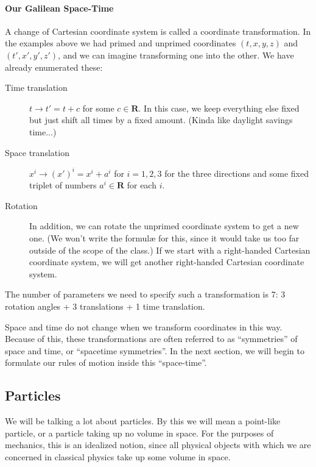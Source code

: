 \paragraph{Our Galilean Space-Time}
A change of Cartesian coordinate system is called a coordinate transformation. In the examples above we had primed and unprimed coordinates $(t, x, y, z)$ and $(t', x', y', z')$, and we can imagine transforming one into the other. 
We have already enumerated these:
\begin{description}
\item[Time translation] $t→ t' = t+c$ for some $c∈ 𝐑$. In this case, we keep everything else fixed but just shift all times by a fixed amount. (Kinda like daylight savings time...)
\item[Space translation] $x^i → (x')^i=x^i + a^i $ for $i=1,2,3$ for the three directions and some fixed triplet of numbers $a^i∈ 𝐑$ for each $i$.
\item[Rotation] In addition, we can rotate the unprimed coordinate system to get a new one. (We won't write the formul\ae{} for this, since it would take us too far outside of the scope of the class.) If we start with a right-handed Cartesian coordinate system, we will get another right-handed Cartesian coordinate system. 
\end{description}
The number of parameters we need to specify such a transformation is 7: 3 rotation angles + 3 translations + 1 time translation.

Space and time do not change when we transform coordinates in this way. 
Because of this, these transformations are often referred to as “symmetries” of space and time, or “spacetime symmetries”. 
In the next section, we will begin to formulate our rules of motion inside this “space-time”.



\subsection{Particles} We will be talking a lot about particles. By this we will mean a point-like particle, or a particle taking up no volume in space. For the purposes of mechanics, this is an idealized notion, since all physical objects with which we are concerned in classical physics take up some volume in space. 

